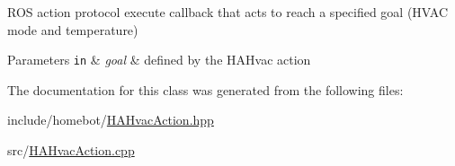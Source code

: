R\-O\-S action protocol execute callback that acts to reach a specified goal (H\-V\-A\-C mode and temperature) 


\begin{DoxyParams}[1]{Parameters}
\mbox{\tt in}  & {\em goal} & defined by the H\-A\-Hvac action \\
\hline
\end{DoxyParams}


The documentation for this class was generated from the following files\-:\begin{DoxyCompactItemize}
\item 
include/homebot/\hyperlink{HAHvacAction_8hpp}{H\-A\-Hvac\-Action.\-hpp}\item 
src/\hyperlink{HAHvacAction_8cpp}{H\-A\-Hvac\-Action.\-cpp}\end{DoxyCompactItemize}
